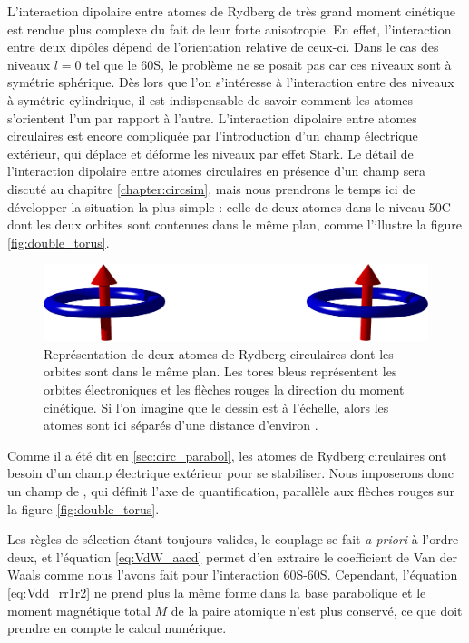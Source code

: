 \noindent L'interaction dipolaire entre atomes de Rydberg de très grand moment cinétique est rendue plus complexe du fait de leur forte anisotropie.
En effet, l'interaction entre deux dipôles dépend de l'orientation relative de ceux-ci.
Dans le cas des niveaux $l=0$ tel que le 60S, le problème ne se posait pas car ces niveaux sont à symétrie sphérique.
Dès lors que l'on s'intéresse à l'interaction entre des niveaux à symétrie cylindrique, il est indispensable de savoir comment les atomes s'orientent l'un par rapport à l'autre.
L'interaction dipolaire entre atomes circulaires est encore compliquée par l'introduction d'un champ électrique extérieur, qui déplace et déforme les niveaux par effet Stark.
Le détail de l'interaction dipolaire entre atomes circulaires en présence d'un champ sera discuté au chapitre \ref{chapter:circsim}, mais nous prendrons le temps ici de développer la situation la plus simple :
celle de deux atomes dans le niveau 50C dont les deux orbites sont contenues dans le même plan, comme l'illustre la figure \eqref{fig:double_torus}.
%
\begin{figure}[!h]
\centering
\vspace{1em}
\includegraphics[width=.8\linewidth]{figures/theory/double_torus.png}
\caption[Deux atomes circulaires côte à côte]{Représentation de deux atomes de Rydberg circulaires dont les orbites sont dans le même plan.
Les tores bleus représentent les orbites électroniques et les flèches rouges la direction du moment cinétique.
Si l'on imagine que le dessin est à l'échelle, alors les atomes sont ici séparés d'une distance d'environ .}
\label{fig:double_torus}
\end{figure}
%
Comme il a été dit en \ref{sec:circ_parabol}, les atomes de Rydberg circulaires ont besoin d'un champ électrique extérieur pour se stabiliser.
Nous imposerons donc un champ de , qui définit l'axe de quantification, parallèle aux flèches rouges sur la figure \eqref{fig:double_torus}.

Les règles de sélection étant toujours valides, le couplage se fait \textit{a priori} à l'ordre deux, et l'équation \eqref{eq:VdW_aacd} permet d'en extraire le coefficient de Van der Waals comme nous l'avons fait pour l'interaction 60S-60S.
Cependant, l'équation \eqref{eq:Vdd_rr1r2} ne prend plus la même forme dans la base parabolique et le moment magnétique total $M$ de la paire atomique n'est plus conservé, ce que doit prendre en compte le calcul numérique.

